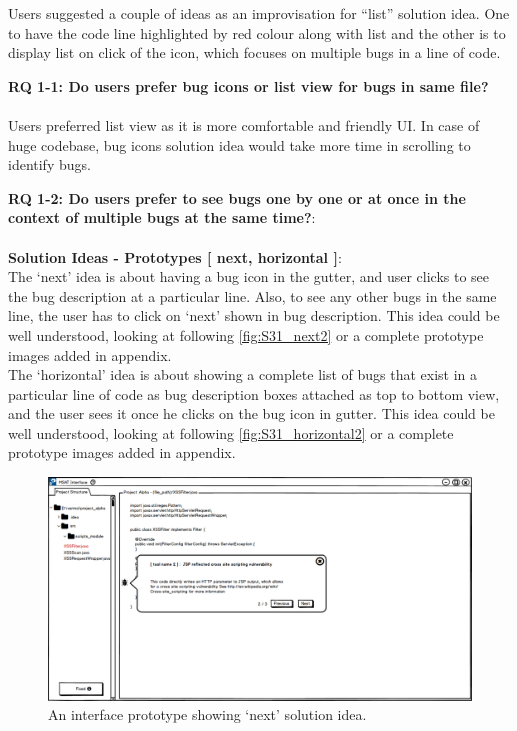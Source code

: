 Users suggested a couple of ideas as an improvisation for “list” solution idea. One to have the code line highlighted by red colour along with list and the other is to display list on click of the icon, which focuses on multiple bugs in a line of code. \\

\begin{myboxi}{{\textbf{RQ 1-1: Do users prefer bug icons or list view for bugs in same file?}}}
	\\ \\ Users preferred list view as it is more comfortable and friendly UI. In case of huge codebase, bug icons solution idea would take more time in scrolling to identify bugs. \\
\end{myboxi}

\clearpage

\noindent \textbf{RQ 1-2: Do users prefer to see bugs one by one or at once in the context of multiple bugs at the same time?}: \\ \\

\textbf{Solution Ideas - Prototypes [ next, horizontal ]}: \\

The ‘next’ idea is about having a bug icon in the gutter, and user clicks to see the bug description at a particular line. Also, to see any other bugs in the same line, the user has to click on ‘next’ shown in bug description. This idea could be well understood, looking at following \autoref{fig:S31_next2} or a complete prototype images added in appendix. \\

The ‘horizontal’ idea is about showing a complete list of bugs that exist in a particular line of code as bug description boxes attached as top to bottom view, and the user sees it once he clicks on the bug icon in gutter. This idea could be well understood, looking at following \autoref{fig:S31_horizontal2} or a complete prototype images added in appendix. \\


\begin{figure}[hbt!]
	\centering
	\includegraphics[width=\linewidth]{figures/solution_ideas_snaps/S31_next}
	\caption{An interface prototype showing ‘next’ solution idea.}
	\label{fig:S31_next2}
\end{figure} 

